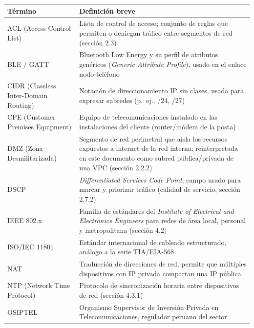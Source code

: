 \documentclass[11pt,a4paper]{article}
\begin{document}
{\small
\begin{longtable}[]{@{}
  >{\raggedright\arraybackslash}p{}
  >{\raggedright\arraybackslash}p{}@{}}
\toprule\noalign{}
\begin{minipage}[b]{\linewidth}\raggedright
Término
\end{minipage} & \begin{minipage}[b]{\linewidth}\raggedright
Definición breve
\end{minipage} \\
\midrule\noalign{}
\endhead
\bottomrule\noalign{}
\endlastfoot
ACL (Access Control List) & Lista de control de acceso; conjunto de reglas que permiten o deniegan tráfico entre segmentos de red (sección 2.3) \\
BLE / GATT & Bluetooth Low Energy y su perfil de atributos genéricos (\emph{Generic Attribute Profile}), usado en el enlace nodo-teléfono \\
CIDR (Classless Inter-Domain Routing) & Notación de direccionamiento IP sin clases, usada para expresar subredes (p.~ej., /24, /27) \\
CPE (Customer Premises Equipment) & Equipo de telecomunicaciones instalado en las instalaciones del cliente (router/módem de la posta) \\
DMZ (Zona Desmilitarizada) & Segmento de red perimetral que aísla los recursos expuestos a internet de la red interna; reinterpretada en este documento como subred pública/privada de una VPC (sección 2.2.2) \\
DSCP & \emph{Differentiated Services Code Point}; campo usado para marcar y priorizar tráfico (calidad de servicio, sección 2.7.2) \\
IEEE 802.x & Familia de estándares del \emph{Institute of Electrical and Electronics Engineers} para redes de área local, personal y metropolitana (sección 4.2) \\
ISO/IEC 11801 & Estándar internacional de cableado estructurado, análogo a la serie TIA/EIA-568 \\
NAT & Traducción de direcciones de red; permite que múltiples dispositivos con IP privada compartan una IP pública \\
NTP (Network Time Protocol) & Protocolo de sincronización horaria entre dispositivos de red (sección 4.3.1) \\
OSIPTEL & Organismo Supervisor de Inversión Privada en Telecomunicaciones, regulador peruano del sector \\

\end{longtable}}
\end{document}
